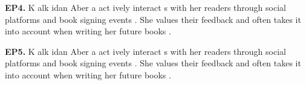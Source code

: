 \begin{mdframed}
\textbf{EP4.} \textcolor{Gray0}{K} \textcolor{Gray0}{alk} \textcolor{Gray0}{idan} \textcolor{Gray0}{Aber} \textcolor{Gray0}{a} \textcolor{Gray0}{act} \textcolor{Gray1}{ively} \textcolor{Gray0}{interact} \textcolor{Gray1}{s} \textcolor{Gray1}{with} \textcolor{Gray1}{her} \textcolor{Gray0}{readers} \textcolor{Gray0}{through} \textcolor{Gray0}{social} \textcolor{Gray0}{platforms} \textcolor{Gray0}{and} \textcolor{Gray0}{book} \textcolor{Gray0}{signing} \textcolor{Gray0}{events} \textcolor{Gray0}{.} \textcolor{Gray0}{She} \textcolor{Gray0}{values} \textcolor{Gray0}{their} \textcolor{Gray0}{feedback} \textcolor{Gray0}{and} \textcolor{Gray0}{often} \textcolor{Gray0}{takes} \textcolor{Gray0}{it} \textcolor{Gray0}{into} \textcolor{Gray0}{account} \textcolor{Gray1}{when} \textcolor{Gray0}{writing} \textcolor{Gray0}{her} \textcolor{Gray0}{future} \textcolor{Gray0}{books} \textcolor{Gray1}{.} 

\textbf{EP5.} \textcolor{Gray0}{K} \textcolor{Gray0}{alk} \textcolor{Gray0}{idan} \textcolor{Gray0}{Aber} \textcolor{Gray0}{a} \textcolor{Gray0}{act} \textcolor{Gray1}{ively} \textcolor{Gray0}{interact} \textcolor{Gray1}{s} \textcolor{Gray1}{with} \textcolor{Gray1}{her} \textcolor{Gray0}{readers} \textcolor{Gray0}{through} \textcolor{Gray0}{social} \textcolor{Gray0}{platforms} \textcolor{Gray0}{and} \textcolor{Gray0}{book} \textcolor{Gray0}{signing} \textcolor{Gray0}{events} \textcolor{Gray0}{.} \textcolor{Gray0}{She} \textcolor{Gray0}{values} \textcolor{Gray0}{their} \textcolor{Gray0}{feedback} \textcolor{Gray0}{and} \textcolor{Gray0}{often} \textcolor{Gray0}{takes} \textcolor{Gray0}{it} \textcolor{Gray0}{into} \textcolor{Gray0}{account} \textcolor{Gray0}{when} \textcolor{Gray0}{writing} \textcolor{Gray0}{her} \textcolor{Gray0}{future} \textcolor{Gray0}{books} \textcolor{Gray0}{.} 

\end{mdframed}

